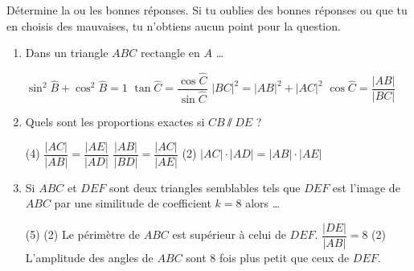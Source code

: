 \documentclass[a4paper, 12pt, parskip=half-, twoside=semi]{scrartcl}
\begin{document}
\begin{connaitre}[points=3]
    Détermine la ou les bonnes réponses. Si tu oublies des bonnes réponses ou que tu en choisis des mauvaises, tu n'obtiens aucun point pour la question.
    \begin{enumerate}
        \item Dans un triangle $ABC$ rectangle en $A$ \dots
              \begin{QCM}
                  \choice $\sin^2\widehat{B} + \cos^2\widehat{B}=1$
                  \choice $\tan\widehat{C} = \dfrac{\cos\widehat{C}}{\sin\widehat{C}}$
                  \choice $|BC|^2 = |AB|^2 + |AC|^2$
                  \choice $\cos\widehat{C}=\dfrac{|AB|}{|BC|}$
              \end{QCM}
        \item Quels sont les proportions exactes si $CB\sslash DE$ ? 
              \begin{QCM}(4)
                  \choice $\dfrac{|AC|}{|AB|}=\dfrac{|AE|}{|AD|}$
                  \choice $\dfrac{|AB|}{|BD|}=\dfrac{|AC|}{|AE|}$
                  \choice*(2) $|AC|\cdot |AD| = |AB| \cdot |AE|$
              \end{QCM}
        \item Si $ABC$ et $DEF$ sont deux triangles semblables tels que $DEF$ est l'image de $ABC$ par une similitude de coefficient $k=8$ alors \dots
              \begin{QCM}(5)
                  \choice*(2) Le périmètre de $ABC$ est supérieur à celui de $DEF$.
                  \choice $\dfrac{|DE|}{|AB|}=8$
                  \choice*(2) L'amplitude des angles de $ABC$ sont 8 fois plus petit que ceux de $DEF$.
              \end{QCM}

\end{enumerate}
\end{connaitre}
\end{document}
